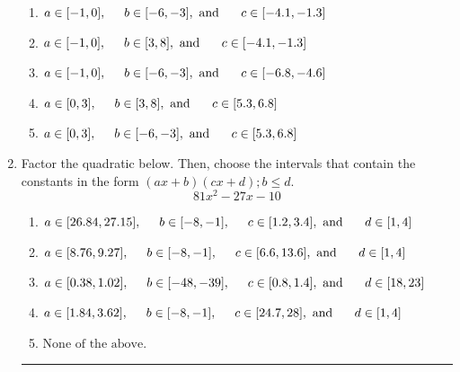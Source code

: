 \documentclass[14pt]{extbook}
\newcommand{\litem}[1]{\item#1\hspace*{-1cm}\rule{\textwidth}{0.4pt}}
\begin{document}
\begin{enumerate}
{\begin{center}
\end{center}
\begin{enumerate}[label=\Alph*.]
\item \( a \in [-1, 0], \hspace*{5mm} b \in [-6, -3], \text{ and } \hspace*{5mm} c \in [-4.1, -1.3] \)
\item \( a \in [-1, 0], \hspace*{5mm} b \in [3, 8], \text{ and } \hspace*{5mm} c \in [-4.1, -1.3] \)
\item \( a \in [-1, 0], \hspace*{5mm} b \in [-6, -3], \text{ and } \hspace*{5mm} c \in [-6.8, -4.6] \)
\item \( a \in [0, 3], \hspace*{5mm} b \in [3, 8], \text{ and } \hspace*{5mm} c \in [5.3, 6.8] \)
\item \( a \in [0, 3], \hspace*{5mm} b \in [-6, -3], \text{ and } \hspace*{5mm} c \in [5.3, 6.8] \)

\end{enumerate} }
\litem{
Factor the quadratic below. Then, choose the intervals that contain the constants in the form $(ax+b)(cx+d); b \leq d.$\[ 81x^{2} -27 x -10 \]\begin{enumerate}[label=\Alph*.]
\item \( a \in [26.84, 27.15], \hspace*{5mm} b \in [-8, -1], \hspace*{5mm} c \in [1.2, 3.4], \text{ and } \hspace*{5mm} d \in [1, 4] \)
\item \( a \in [8.76, 9.27], \hspace*{5mm} b \in [-8, -1], \hspace*{5mm} c \in [6.6, 13.6], \text{ and } \hspace*{5mm} d \in [1, 4] \)
\item \( a \in [0.38, 1.02], \hspace*{5mm} b \in [-48, -39], \hspace*{5mm} c \in [0.8, 1.4], \text{ and } \hspace*{5mm} d \in [18, 23] \)
\item \( a \in [1.84, 3.62], \hspace*{5mm} b \in [-8, -1], \hspace*{5mm} c \in [24.7, 28], \text{ and } \hspace*{5mm} d \in [1, 4] \)
\item \( \text{None of the above.} \)


\end{enumerate}}
\end{enumerate}
\end{document}
